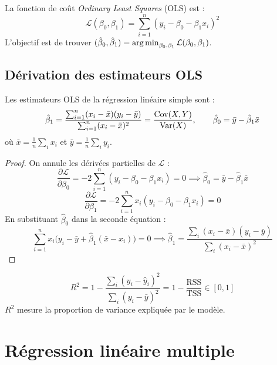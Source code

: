 \begin{definition}
La fonction de co\^ut \emph{Ordinary Least Squares} (OLS) est :
\[
  \mathcal{L}(\beta_0, \beta_1) = \sum_{i=1}^{n} (y_i - \beta_0 - \beta_1 x_i)^2
\]
L'objectif est de trouver $(\hat{\beta}_0, \hat{\beta}_1) = \operatorname*{arg\,min}_{\beta_0, \beta_1} \mathcal{L}(\beta_0, \beta_1)$.
\end{definition}

\subsection{D\'erivation des estimateurs OLS}

\begin{theoreme}
\label{thm:ols-simple}
Les estimateurs OLS de la r\'egression lin\'eaire simple sont :
\[
  \hat{\beta}_1 = \frac{\sum_{i=1}^{n}(x_i - \bar{x})(y_i - \bar{y})}{\sum_{i=1}^{n}(x_i - \bar{x})^2}
  = \frac{\mathrm{Cov}(X, Y)}{\mathrm{Var}(X)}, \qquad
  \hat{\beta}_0 = \bar{y} - \hat{\beta}_1 \bar{x}
\]
o\`u $\bar{x} = \frac{1}{n}\sum_{i} x_i$ et $\bar{y} = \frac{1}{n}\sum_{i} y_i$.
\end{theoreme}

\begin{proof}
On annule les d\'eriv\'ees partielles de $\mathcal{L}$ :
\[
  \frac{\partial \mathcal{L}}{\partial \beta_0} = -2\sum_{i=1}^{n}(y_i - \beta_0 - \beta_1 x_i) = 0
  \implies \hat{\beta}_0 = \bar{y} - \hat{\beta}_1 \bar{x}
\]
\[
  \frac{\partial \mathcal{L}}{\partial \beta_1} = -2\sum_{i=1}^{n} x_i(y_i - \beta_0 - \beta_1 x_i) = 0
\]
En substituant $\hat{\beta}_0$ dans la seconde \'equation :
\[
  \sum_{i=1}^{n} x_i \bigl(y_i - \bar{y} + \hat{\beta}_1(\bar{x} - x_i)\bigr) = 0
  \implies \hat{\beta}_1 = \frac{\sum_{i}(x_i - \bar{x})(y_i - \bar{y})}{\sum_{i}(x_i - \bar{x})^2}
\]
\end{proof}

\begin{formules}[title=\textbf{Coefficient de d\'etermination}]
\[
  R^2 = 1 - \frac{\sum_{i}(y_i - \hat{y}_i)^2}{\sum_{i}(y_i - \bar{y})^2}
  = 1 - \frac{\text{RSS}}{\text{TSS}} \in [0, 1]
\]
$R^2$ mesure la proportion de variance expliqu\'ee par le mod\`ele.
\end{formules}

\section{R\'egression lin\'eaire multiple}
\label{sec:reg-multiple}

